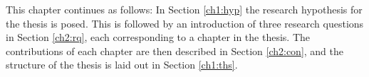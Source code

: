   This chapter continues as follows: In Section \ref{ch1:hyp} the research hypothesis for the thesis is posed. This is followed by an introduction of three research questions in Section \ref{ch2:rq}, each corresponding to a chapter in the thesis. The contributions of each chapter are  then described in Section \ref{ch2:con}, and the structure of the thesis is laid out in Section \ref{ch1:ths}. 








